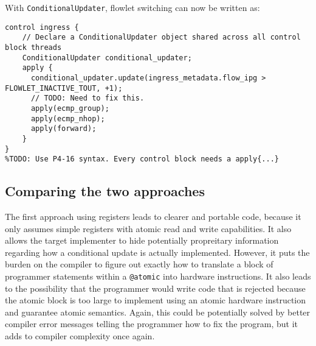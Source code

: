With \texttt{ConditionalUpdater}, flowlet switching can now be written as:

\begin{verbatim}
control ingress {
    // Declare a ConditionalUpdater object shared across all control block threads
    ConditionalUpdater conditional_updater;
    apply {
      conditional_updater.update(ingress_metadata.flow_ipg > FLOWLET_INACTIVE_TOUT, +1);
      // TODO: Need to fix this.
      apply(ecmp_group);
      apply(ecmp_nhop);
      apply(forward);
    }
}
%TODO: Use P4-16 syntax. Every control block needs a apply{...}
\end{verbatim}

\subsection{Comparing the two approaches}
The first approach using registers leads to clearer and portable code, because
it only assumes simple registers with atomic read and write capabilities. It
also allows the target implementer to hide potentially propreitary information
regarding how a conditional update is actually implemented. However, it puts
the burden on the compiler to figure out exactly how to translate a block of
programmer statements within a \texttt{@atomic} into hardware instructions. It
also leads to the possibility that the programmer would write code that is
rejected because the atomic block is too large to implement using an atomic
hardware instruction and guarantee atomic semantics. Again, this could be
potentially solved by better compiler error messages telling the programmer how
to fix the program, but it adds to compiler complexity once again. 
